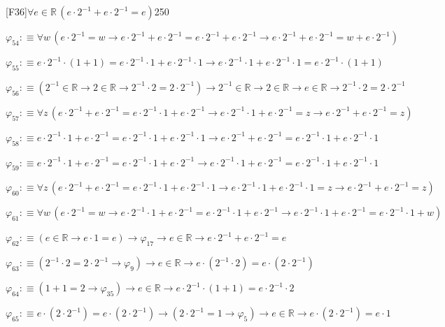 \begin{fullproof}{[F36]}{$\forall e \in \mathbb{R}\,(e \cdot 2^{-1} + e \cdot 2^{-1} = e)$}{250}
\begin{abbrevlist}
\item $\varphi_{54} :\equiv \forall w\,(e \cdot 2^{-1} = w \to e \cdot 2^{-1} + e \cdot 2^{-1} = e \cdot 2^{-1} + e \cdot 2^{-1} \to e \cdot 2^{-1} + e \cdot 2^{-1} = w + e \cdot 2^{-1})$
\item $\varphi_{55} :\equiv e \cdot 2^{-1} \cdot (1 + 1) = e \cdot 2^{-1} \cdot 1 + e \cdot 2^{-1} \cdot 1 \to e \cdot 2^{-1} \cdot 1 + e \cdot 2^{-1} \cdot 1 = e \cdot 2^{-1} \cdot (1 + 1)$
\item $\varphi_{56} :\equiv (2^{-1} \in \mathbb{R} \to 2 \in \mathbb{R} \to 2^{-1} \cdot 2 = 2 \cdot 2^{-1}) \to 2^{-1} \in \mathbb{R} \to 2 \in \mathbb{R} \to e \in \mathbb{R} \to 2^{-1} \cdot 2 = 2 \cdot 2^{-1}$
\item $\varphi_{57} :\equiv \forall z\,(e \cdot 2^{-1} + e \cdot 2^{-1} = e \cdot 2^{-1} \cdot 1 + e \cdot 2^{-1} \to e \cdot 2^{-1} \cdot 1 + e \cdot 2^{-1} = z \to e \cdot 2^{-1} + e \cdot 2^{-1} = z)$
\item $\varphi_{58} :\equiv e \cdot 2^{-1} \cdot 1 + e \cdot 2^{-1} = e \cdot 2^{-1} \cdot 1 + e \cdot 2^{-1} \cdot 1 \to e \cdot 2^{-1} + e \cdot 2^{-1} = e \cdot 2^{-1} \cdot 1 + e \cdot 2^{-1} \cdot 1$
\item $\varphi_{59} :\equiv e \cdot 2^{-1} \cdot 1 + e \cdot 2^{-1} = e \cdot 2^{-1} \cdot 1 + e \cdot 2^{-1} \to e \cdot 2^{-1} \cdot 1 + e \cdot 2^{-1} = e \cdot 2^{-1} \cdot 1 + e \cdot 2^{-1} \cdot 1$
\item $\varphi_{60} :\equiv \forall z\,(e \cdot 2^{-1} + e \cdot 2^{-1} = e \cdot 2^{-1} \cdot 1 + e \cdot 2^{-1} \cdot 1 \to e \cdot 2^{-1} \cdot 1 + e \cdot 2^{-1} \cdot 1 = z \to e \cdot 2^{-1} + e \cdot 2^{-1} = z)$
\item $\varphi_{61} :\equiv \forall w\,(e \cdot 2^{-1} = w \to e \cdot 2^{-1} \cdot 1 + e \cdot 2^{-1} = e \cdot 2^{-1} \cdot 1 + e \cdot 2^{-1} \to e \cdot 2^{-1} \cdot 1 + e \cdot 2^{-1} = e \cdot 2^{-1} \cdot 1 + w)$
\item $\varphi_{62} :\equiv (e \in \mathbb{R} \to e \cdot 1 = e) \to \varphi_{17} \to e \in \mathbb{R} \to e \cdot 2^{-1} + e \cdot 2^{-1} = e$
\item $\varphi_{63} :\equiv (2^{-1} \cdot 2 = 2 \cdot 2^{-1} \to \varphi_{9}) \to e \in \mathbb{R} \to e \cdot (2^{-1} \cdot 2) = e \cdot (2 \cdot 2^{-1})$
\item $\varphi_{64} :\equiv (1 + 1 = 2 \to \varphi_{35}) \to e \in \mathbb{R} \to e \cdot 2^{-1} \cdot (1 + 1) = e \cdot 2^{-1} \cdot 2$
\item $\varphi_{65} :\equiv e \cdot (2 \cdot 2^{-1}) = e \cdot (2 \cdot 2^{-1}) \to (2 \cdot 2^{-1} = 1 \to \varphi_{5}) \to e \in \mathbb{R} \to e \cdot (2 \cdot 2^{-1}) = e \cdot 1$

\end{abbrevlist}
\end{fullproof}
